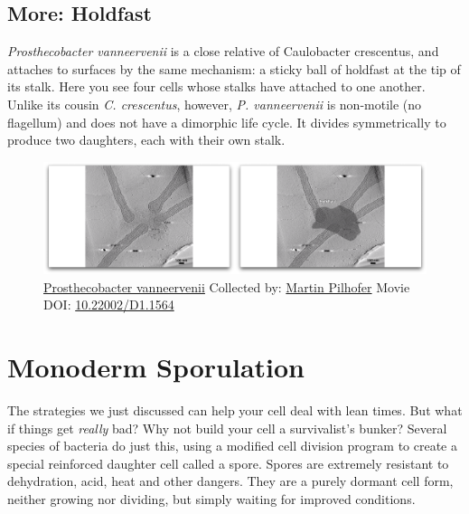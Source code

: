 \documentclass[]{tufte-book}
\begin{document}
\hypertarget{Holdfast}{\subsection*{More: Holdfast}\label{Holdfast}}

\emph{Prosthecobacter vanneervenii} is a close relative of Caulobacter
crescentus, and attaches to surfaces by the same mechanism: a sticky
ball of holdfast at the tip of its stalk. Here you see four cells whose
stalks have attached to one another. Unlike its cousin \emph{C.
crescentus}, however, \emph{P. vanneervenii} is non-motile (no
flagellum) and does not have a dimorphic life cycle. It divides
symmetrically to produce two daughters, each with their own stalk.





\begin{figure}
\includegraphics{movie_stills/8_4a} \caption[\protect\hyperlink{tree}{Prosthecobacter vanneervenii}
Collected by: \protect\hyperlink{martin_pilhofer}{Martin Pilhofer} Movie
DOI: \href{https://doi.org/10.22002/D1.1564}{10.22002/D1.1564}]{\protect\hyperlink{tree}{Prosthecobacter vanneervenii}
Collected by: \protect\hyperlink{martin_pilhofer}{Martin Pilhofer} Movie
DOI: \href{https://doi.org/10.22002/D1.1564}{10.22002/D1.1564}}\label{fig:8-4a}
\end{figure}

\section{Monoderm Sporulation}\label{monoderm-sporulation}

The strategies we just discussed can help your cell deal with lean
times. But what if things get \emph{really} bad? Why not build your cell
a survivalist's bunker? Several species of bacteria do just this, using
a modified cell division program to create a special reinforced daughter
cell called a spore. Spores are extremely resistant to dehydration,
acid, heat and other dangers. They are a purely dormant cell form,
neither growing nor dividing, but simply waiting for improved
conditions.
\end{document}
